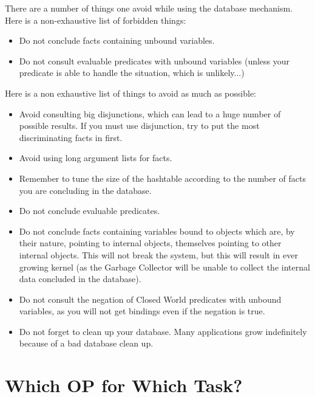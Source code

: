 There are a number of things one avoid while using the
database mechanism. Here is a non-exhaustive list of forbidden things:

\begin{itemize}

\item Do not conclude facts containing unbound variables.

\item Do not consult evaluable predicates with unbound variables (unless
your predicate is able to handle the situation, which is unlikely...)

\end{itemize}

Here is a non exhaustive list of things to avoid as much as possible:

\begin{itemize}

\item Avoid consulting big disjunctions, which can lead to a huge number
of possible results. If you must use disjunction, try to put the most
discriminating facts in first.

\item Avoid using long argument lists for facts.

\item Remember to tune the size of the hashtable according to the number
of facts you are concluding in the database.

\item Do not conclude evaluable predicates.

\item Do not conclude facts containing variables bound to objects which
are, by their nature, pointing to internal objects, themselves pointing
to other internal objects. This will not break the system, but this will
result in ever growing kernel (as the Garbage Collector will be unable to
collect the internal data concluded in the database).

\item Do not consult the negation of Closed World predicates with unbound
variables, as you will not get bindings even if the negation is true.

\item Do not forget to clean up your database. Many applications grow
indefinitely because of a bad database clean up.

\end{itemize}

\section{Which OP for Which Task?}



